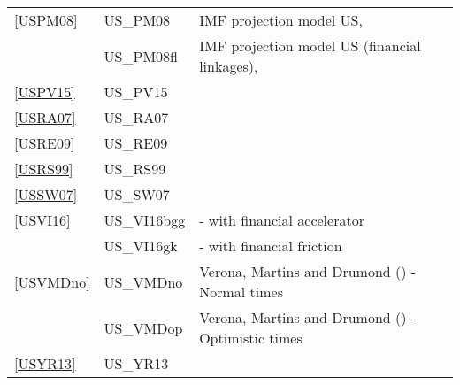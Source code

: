 \documentclass[11pt,a4paper]{article}
\begin{document}
\begin{table}[H]
\begin{tabularx}{\textwidth}{lll}
			\ref{USPM08} & US\_PM08 & IMF projection model US, \cite{Carabenciovetal2008} \\
			& US\_PM08fl & IMF projection model US (financial linkages),\cite{Carabenciovetal2008}  \\
			\ref{USPV15} & US\_PV15 & \cite{poutineau2015financial} \\		
			\ref{USRA07} & US\_RA07 & \cite{Rabanal2007} \\
			\ref{USRE09} & US\_RE09 & \cite{reis2009sticky}\\
			\ref{USRS99} & US\_RS99 & \cite{RudebuschSvensson1999} \\
			\ref{USSW07} & US\_SW07 & \cite{SmetsWouters2007} \\
			\ref{USVI16} & US\_VI16bgg & \cite{villa2016}  - with \cite{BernankeGertlerGilchrist1999} financial accelerator \\
			& US\_VI16gk & \cite{villa2016} - with \cite{GertlerKaradi2013} financial friction \\
			\ref{USVMDno} & US\_VMDno & Verona, Martins and Drumond (\cite{Veronaetal2013}) - Normal times \\
			& US\_VMDop & Verona, Martins and Drumond (\cite{Veronaetal2013}) - Optimistic times \\
			\ref{USYR13} & US\_YR13 & \cite{rychalovska2016} \\ 
			

\end{tabularx}
\end{table}
\end{document}
